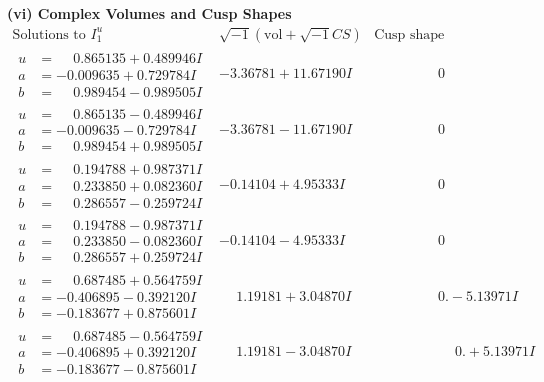 \documentclass[1p]{elsarticle_modified}
\theoremstyle{definition}
\newcommand{\I}{\sqrt{-1}}
\begin{document}
\newpage\flushleft \textbf{(vi) Complex Volumes and Cusp Shapes}
$$\begin{array}{c|c|c}  
\text{Solutions to }I^u_{1}& \I (\text{vol} + \sqrt{-1}CS) & \text{Cusp shape}\\
 \hline 
\begin{aligned}
u &= \phantom{-}0.865135 + 0.489946 I \\
a &= -0.009635 + 0.729784 I \\
b &= \phantom{-}0.989454 - 0.989505 I\end{aligned}
 & -3.36781 + 11.67190 I & \phantom{-0.000000 } 0 \\ \hline\begin{aligned}
u &= \phantom{-}0.865135 - 0.489946 I \\
a &= -0.009635 - 0.729784 I \\
b &= \phantom{-}0.989454 + 0.989505 I\end{aligned}
 & -3.36781 - 11.67190 I & \phantom{-0.000000 } 0 \\ \hline\begin{aligned}
u &= \phantom{-}0.194788 + 0.987371 I \\
a &= \phantom{-}0.233850 + 0.082360 I \\
b &= \phantom{-}0.286557 - 0.259724 I\end{aligned}
 & -0.14104 + 4.95333 I & \phantom{-0.000000 } 0 \\ \hline\begin{aligned}
u &= \phantom{-}0.194788 - 0.987371 I \\
a &= \phantom{-}0.233850 - 0.082360 I \\
b &= \phantom{-}0.286557 + 0.259724 I\end{aligned}
 & -0.14104 - 4.95333 I & \phantom{-0.000000 } 0 \\ \hline\begin{aligned}
u &= \phantom{-}0.687485 + 0.564759 I \\
a &= -0.406895 - 0.392120 I \\
b &= -0.183677 + 0.875601 I\end{aligned}
 & \phantom{-}1.19181 + 3.04870 I & \phantom{-0.000000 } 0. - 5.13971 I \\ \hline\begin{aligned}
u &= \phantom{-}0.687485 - 0.564759 I \\
a &= -0.406895 + 0.392120 I \\
b &= -0.183677 - 0.875601 I\end{aligned}
 & \phantom{-}1.19181 - 3.04870 I & \phantom{-0.000000 -}0. + 5.13971 I \\ \hline\begin{aligned}

\end{aligned}
\end{array}$$
\end{document}
